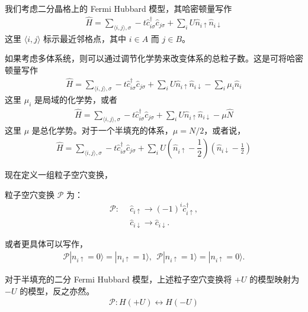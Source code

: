 我们考虑二分晶格上的 Fermi Hubbard 模型，其哈密顿量写作
\begin{align}
    \hat{H} = \sum_{\langle i,j\rangle,\sigma} -t\hat{c}_{i\sigma}^{\dagger}\hat{c}_{j\sigma} + \sum_{i} U \hat{n}_{i\uparrow}\hat{n}_{i\downarrow} 
\end{align}
这里 $\langle i,j\rangle$ 标示最近邻格点，其中 $i\in A$ 而 $j\in B$。

如果考虑多体系统，则可以通过调节化学势来改变体系的总粒子数。这是可将哈密顿量写作
\begin{align}
    \hat{H} = \sum_{\langle i,j\rangle,\sigma} -t\hat{c}_{i\sigma}^{\dagger}\hat{c}_{j\sigma} + \sum_{i} U \hat{n}_{i\uparrow}\hat{n}_{i\downarrow} - \sum_i\mu_i\hat{n}_i
\end{align}
这里 $\mu_i$ 是局域的化学势，或者
\begin{align}
    \hat{H} = \sum_{\langle i,j\rangle,\sigma} -t\hat{c}_{i\sigma}^{\dagger}\hat{c}_{j\sigma} + \sum_{i} U \hat{n}_{i\uparrow}\hat{n}_{i\downarrow} -\mu\hat{N}
\end{align}
这里 $\mu$ 是总化学势。对于一个半填充的体系，$\mu=N/2$，或者说，
\begin{align}
    \hat{H} = \sum_{\langle i,j\rangle,\sigma} -t\hat{c}_{i\sigma}^{\dagger}\hat{c}_{j\sigma} + \sum_{i} U \left(\hat{n}_{i\uparrow}-\dfrac{1}{2}\right)\left(\hat{n}_{i\downarrow}-\frac{1}{2}\right) 
\end{align}

现在定义一组粒子空穴变换，
\begin{definition}
粒子空穴变换 $\mathcal{P}$ 为：
\begin{align}
    \mathcal{P} : \  \  
    & \hat{c}_{i\uparrow} \rightarrow (-1)^{i} \hat{c}_{i\uparrow}^{\dagger},  \nonumber\\
    & \hat{c}_{i\downarrow} \rightarrow \hat{c}_{i\downarrow}. 
\end{align}
\end{definition}
或者更具体可以写作，
\begin{align}
    \mathcal{P} |n_{i\uparrow} = 0\rangle = |n_{i\uparrow} = 1\rangle, \  \  
    \mathcal{P} |n_{i\uparrow} = 1\rangle = |n_{i\uparrow} = 0\rangle. 
\end{align}

\begin{lemma}\label{lemma1}
对于半填充的二分 Fermi Hubbard 模型，上述粒子空穴变换将 $+U$ 的模型映射为 $-U$ 的模型，反之亦然。
\begin{align}
\mathcal{P}: H(+U) \leftrightarrow H(-U)
\end{align}
\end{lemma}

